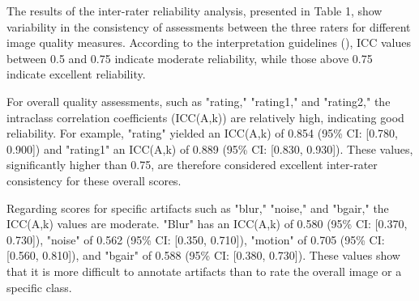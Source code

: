 

The results of the inter-rater reliability analysis, presented in Table 1, show variability in the consistency of assessments between the three raters for different image quality measures.
According to the interpretation guidelines (\cite{koo_guideline_2016}), ICC values between 0.5 and 0.75 indicate moderate reliability, while those above 0.75 indicate excellent reliability.

For overall quality assessments, such as "rating," "rating1," and "rating2," the intraclass correlation coefficients (ICC(A,k)) are relatively high, indicating good reliability. For example, "rating" yielded an ICC(A,k) of 0.854 (95\% CI: [0.780, 0.900]) and "rating1" an ICC(A,k) of 0.889 (95\% CI: [0.830, 0.930]). These values, significantly higher than 0.75, are therefore considered excellent inter-rater consistency for these overall scores.

Regarding scores for specific artifacts such as "blur," "noise," and "bgair," the ICC(A,k) values are moderate. "Blur" has an ICC(A,k) of 0.580 (95\% CI: [0.370, 0.730]), "noise" of 0.562 (95\% CI: [0.350, 0.710]), "motion" of 0.705 (95\% CI: [0.560, 0.810]), and "bgair" of 0.588 (95\% CI: [0.380, 0.730]). These values show that it is more difficult to annotate artifacts than to rate the overall image or a specific class.

